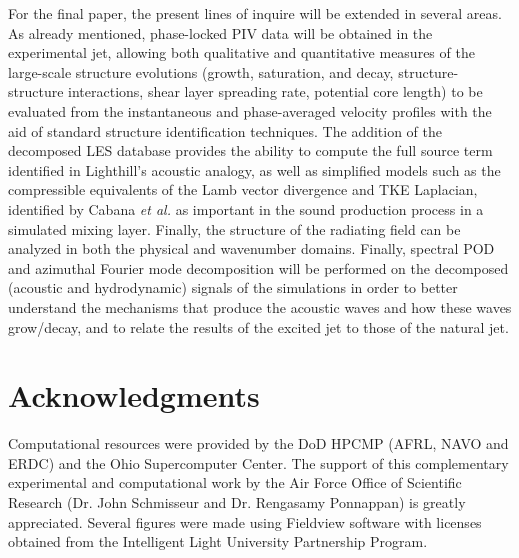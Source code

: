 \documentclass[english]{aiaa-tc}
\begin{document}
For the final paper, the present lines of inquire will be extended in several areas. As already mentioned, phase-locked PIV data will be obtained in the experimental jet, allowing both qualitative and quantitative measures of the large-scale structure evolutions (growth, saturation, and decay, structure-structure interactions, shear layer spreading rate, potential core length) to be evaluated from the instantaneous and phase-averaged velocity profiles with the aid of standard structure identification techniques. The addition of the decomposed LES database provides the ability to compute the full source term identified in Lighthill's acoustic analogy, as well as simplified models such as the compressible equivalents of the Lamb vector divergence and TKE Laplacian, identified by Cabana {\em et al.}\cite{Cabana2008} as important in the sound production process in a simulated mixing layer. Finally, the structure of the radiating field can be analyzed in both the physical and wavenumber domains. Finally, spectral POD and azimuthal Fourier mode decomposition will be performed on the decomposed (acoustic and hydrodynamic) signals of the simulations in order to better understand the mechanisms that produce the acoustic waves and how these waves grow/decay, and to relate the results of the excited jet to those of the natural jet. 


\section*{Acknowledgments}
   Computational resources were provided by the DoD HPCMP (AFRL, NAVO and ERDC) and the Ohio Supercomputer Center. The support of this complementary experimental and computational work by the Air Force Office of Scientific Research (Dr. John Schmisseur and Dr. Rengasamy Ponnappan) is greatly appreciated. Several figures were made using Fieldview software with licenses obtained from the Intelligent Light University Partnership Program.



\end{document}
